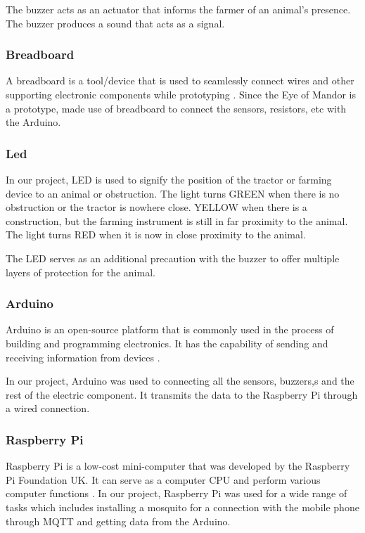 \documentclass[12pt]{article}
\begin{document}
The buzzer acts as an actuator that informs the farmer of an animal's presence. The buzzer produces a sound that acts as a signal.

\subsubsection{Breadboard}

A breadboard is a tool/device that is used to seamlessly connect wires and other supporting electronic components while prototyping \cite{tech1}. Since the Eye of Mandor is a prototype, made use of breadboard to connect the sensors, resistors, etc with the Arduino.

\subsubsection{Led}

In our project, LED is used to signify the position of the tractor or farming device to an animal or obstruction. The light turns GREEN when there is no obstruction or the tractor is nowhere close. YELLOW when there is a construction, but the farming instrument is still in far proximity to the animal. The light turns RED when it is now in close proximity to the animal.

The LED serves as an additional precaution with the buzzer to offer multiple layers of protection for the animal.

\subsubsection{Arduino}

Arduino is an open-source platform that is commonly used in the process of building and programming electronics. It has the capability of sending and receiving information from devices \cite{tech2}.

In our project, Arduino was used to connecting all the sensors, buzzers,s and the rest of the electric component. It transmits the data to the Raspberry Pi through a wired connection.

\subsubsection{Raspberry Pi} 

Raspberry Pi is a low-cost mini-computer that was developed by the Raspberry Pi Foundation UK. It can serve as a computer CPU and perform various computer functions \cite{tech3}. In our project, Raspberry Pi was used for a wide range of tasks which includes installing a mosquito for a connection with the mobile phone through MQTT and getting data from the Arduino.
\end{document}
